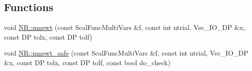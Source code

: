 \subsection*{Functions}
\begin{DoxyCompactItemize}
\item 
void \mbox{\hyperlink{namespaceNR_a9217e3777ed00b4cd6f83abd69e4cef9}{N\+R\+::mnewt}} (const Scal\+Func\+Multi\+Vars \&f, const int ntrial, Vec\+\_\+\+I\+O\+\_\+\+DP \&x, const DP tolx, const DP tolf)
\item 
void \mbox{\hyperlink{namespaceNR_a613c01d6d0517310d92cab226cef58bc}{N\+R\+::mnewt\+\_\+safe}} (const Scal\+Func\+Multi\+Vars \&f, const int ntrial, Vec\+\_\+\+I\+O\+\_\+\+DP \&x, const DP tolx, const DP tolf, const bool do\+\_\+check)
\end{DoxyCompactItemize}
